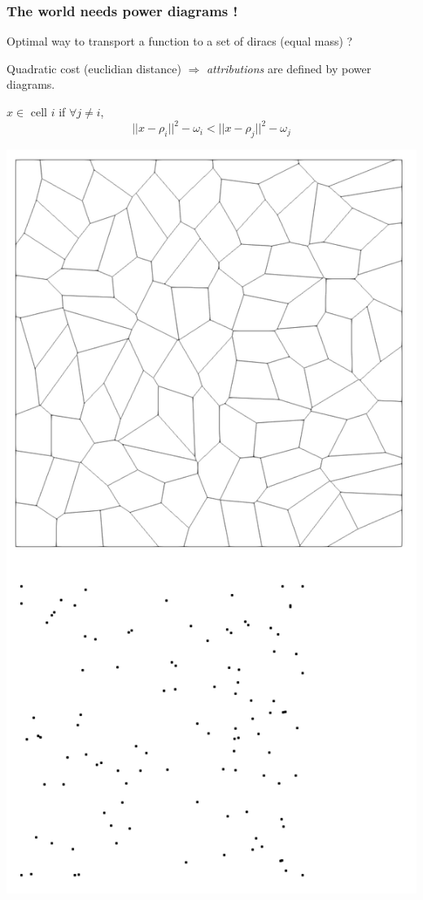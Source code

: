 \documentclass[aspectratio=169]{beamer}
\begin{document}
\begin{frame}
    \frametitle{The world needs power diagrams !}

    \begin{minipage}[c][0.6\textheight][c]{0.5\textwidth}
        Optimal way to transport a function to a set of diracs (equal mass) ? 
        
        \vfill
        Quadratic cost (euclidian distance) $\Rightarrow$ \textit{attributions} are 
            defined by power diagrams.
        
        \vfill
        $x \in$ cell $i$ if $\forall j \neq i$,
         $$|| x - \rho_i ||^2 - \omega_i < || x - \rho_j ||^2 - \omega_j $$
    \end{minipage}
    \kern 0.5cm
    \begin{minipage}{0.45\textwidth}
        \begin{center}
            \includegraphics[height=0.8\textheight]{img/pd.png}
        \end{center}
    \end{minipage}
\end{frame}
\end{document}
